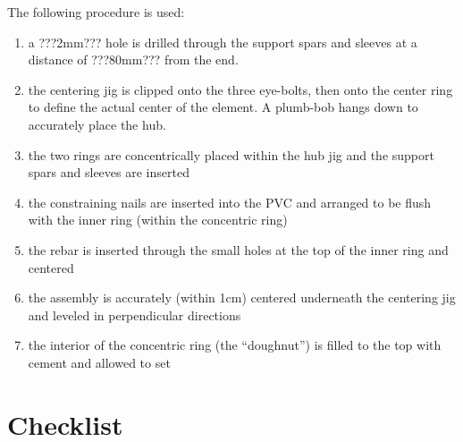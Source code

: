 \documentclass[11pt]{article}
\begin{document}
The following procedure is used:

\begin{enumerate}
\item a ???2mm??? hole is drilled through the support spars and sleeves at a distance of ???80mm??? from the end.
\item the centering jig is clipped onto the three eye-bolts, then onto the center ring to define the actual center of the element.  A plumb-bob hangs down to accurately place the hub.
\item the two rings are concentrically placed within the hub jig and the support spars and sleeves are inserted
\item the constraining nails are inserted into the PVC and arranged to be flush with the inner ring (within the concentric ring)
\item the rebar is inserted through the small holes at the top of the inner ring and centered
\item the assembly is accurately (within 1cm) centered underneath the centering jig and leveled in perpendicular directions
\item the interior of the concentric ring (the ``doughnut'') is filled to the top with cement and allowed to set
\end{enumerate}

\newpage
\appendix
\section{Checklist}
\end{document}
